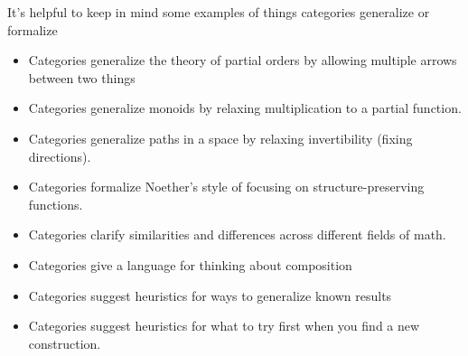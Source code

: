 \documentclass[a5paper]{scrartcl}
\begin{document}
It's helpful to keep in mind some examples of things categories generalize or formalize
\begin{itemize}
  \item Categories generalize the theory of partial orders by allowing multiple arrows between two things
  \item Categories generalize monoids by relaxing multiplication to a partial function.
  \item Categories generalize paths in a space by relaxing invertibility (fixing directions).
  \item Categories formalize Noether's style of focusing on structure-preserving functions.
  \item Categories clarify similarities and differences across different fields of math.
  \item Categories give a language for thinking about composition
  \item Categories suggest heuristics for ways to generalize known results
  \item Categories suggest heuristics for what to try first when you find a new construction.
\end{itemize}
\end{document}
